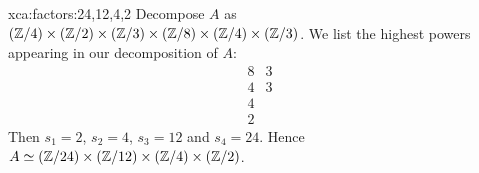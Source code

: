 \begin{sol}{xca:factors:24,12,4,2}
Decompose $A$ as $(\mathbb{Z}/4)\times(\mathbb{Z}/2)\times(\mathbb{Z}/3)\times(\mathbb{Z}/8)\times(\mathbb{Z}/4)\times(\mathbb{Z}/3)$.
We list the highest powers appearing in our decomposition of $A$: 
\[ 
\begin{matrix}
8&3\\
4&3\\
4\\
2
\end{matrix} 
\] 
Then $s_1=2$, $s_2=4$, $s_3=12$ and $s_4=24$. Hence 
$A\simeq (\mathbb{Z}/24)\times(\mathbb{Z}/12)\times(\mathbb{Z}/4)\times(\mathbb{Z}/2)$.
\end{sol}
